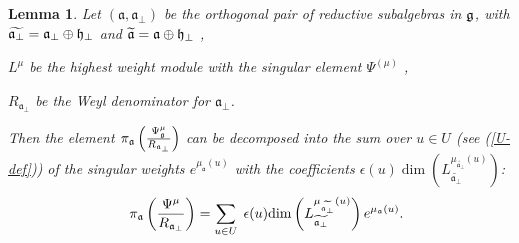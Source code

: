 \documentclass[12pt]{iopart}
\newtheorem{lemma}{Lemma}
\theoremstyle{definition}
\newcommand{\af}{\mathfrak{a}}
\newcommand{\afb}{\mathfrak{a}_{\bot}}
\begin{document}
\begin{lemma}
Let $\left( \af,\afb \right)$ be the orthogonal pair of reductive
subalgebras in $\frak{g}$, with $\widetilde{\af_{\perp }}=\af%
_{\perp }\oplus \frak{h}_{\perp }$ and $\widetilde{\af}=\af\oplus
\frak{h}_{\perp }$ ,

$L^{\mu }$ be the highest weight module with the singular element
$\Psi ^{\left(\mu \right)}$ ,

$R_{\af_{\perp }}$ be the Weyl denominator for $\af_{\perp }$.

Then the element $\pi _{\af}\left( \frac{\Psi _{\frak{g}}^{\mu }}{R_{%
\af_{\perp }}}\right) $ can be decomposed into the sum over $u\in U$ (see (\ref{U-def})) of
the singular weights $e^{\mu _{\af}\left( u\right) }$ with the
coefficients $\epsilon (u)\mathrm{\dim }\left( L_{\widetilde{\af_{\perp
}}}^{\mu _{\widetilde{\af_{\perp }}}\left( u\right) }\right) $:
\begin{equation}
\quad \pi _{\af}\left( \frac{\Psi^{\mu }}{R_{\af%
_{\perp }}}\right) =\sum_{u\in U}\;\epsilon (u)\mathrm{\dim }
\left( L_{\widetilde{\af_{\perp }}}^{\mu _{%
\widetilde{\af_{\perp }}}\left( u\right) }\right) e^{\mu _{\af}\left( u \right) }.
\end{equation}
\end{lemma}
\end{document}
